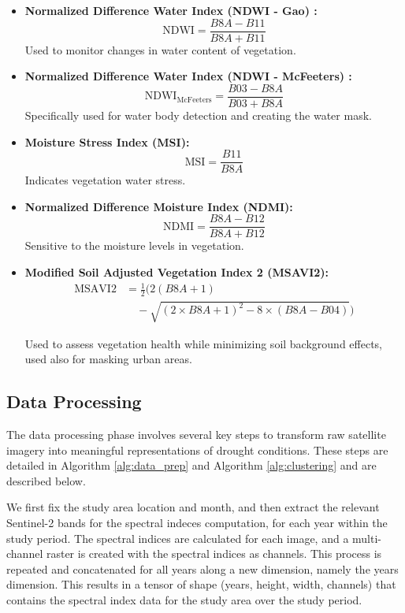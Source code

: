 \documentclass[10pt,twocolumn]{article}
\begin{document}
\begin{itemize}
    \item \textbf{Normalized Difference Water Index (NDWI - Gao) \cite{gao1996ndwi}:}
    \begin{equation*}
    \text{NDWI} = \frac{B8A - B11}{B8A + B11}
    \end{equation*}
    Used to monitor changes in water content of vegetation.
    \item \textbf{Normalized Difference Water Index (NDWI - McFeeters) \cite{mcfeeters1996use}:}
    \begin{equation*}
    \text{NDWI}_{\text{McFeeters}} = \frac{B03 - B8A}{B03 + B8A}
    \end{equation*}
    Specifically used for water body detection and creating the water mask.
    \item \textbf{Moisture Stress Index (MSI):}
    \begin{equation*}
    \text{MSI} = \frac{B11}{B8A}
    \end{equation*}
    Indicates vegetation water stress.
    \item \textbf{Normalized Difference Moisture Index (NDMI):}
    \begin{equation*}
    \text{NDMI} = \frac{B8A - B12}{B8A + B12}
    \end{equation*}
    Sensitive to the moisture levels in vegetation.
    \item \textbf{Modified Soil Adjusted Vegetation Index 2 (MSAVI2):}
    \begin{align*}
      \text{MSAVI2} &= \frac{1}{2} \Big( 2(B8A + 1) \\
      &\quad - \sqrt{(2 \times B8A + 1)^2 - 8 \times (B8A - B04)} \Big)
    \end{align*}
      
    Used to assess vegetation health while minimizing soil background effects, used also for masking urban areas.
\end{itemize}

\subsection{Data Processing}
The data processing phase involves several key steps to transform raw satellite imagery into meaningful representations of drought conditions. These steps are detailed in Algorithm \ref{alg:data_prep} and Algorithm \ref{alg:clustering} and are described below.

We first fix the study area location and month, and then extract the relevant Sentinel-2 bands for the spectral indeces computation, for each year within the study period. The spectral indices are calculated for each image, and a multi-channel raster is created with the spectral indices as channels. This process is repeated and concatenated for all years along a new dimension, namely the years dimension. This results in a tensor of shape (years, height, width, channels) that contains the spectral index data for the study area over the study period.
\end{document}
